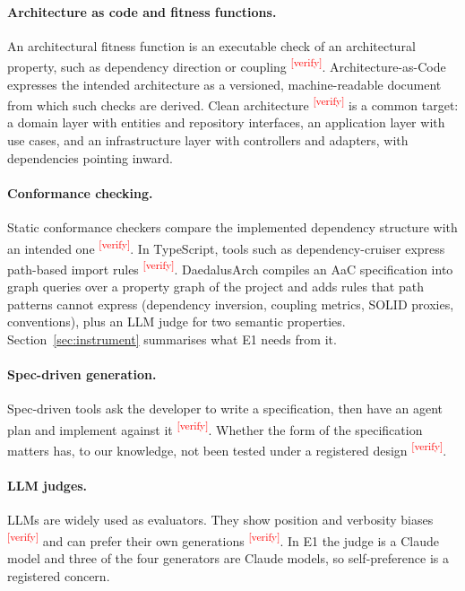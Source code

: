 \documentclass[10pt,a4paper]{article}
\newcommand{\citeneeded}[1]{\cite{#1}\textsuperscript{\textcolor{red}{\tiny[verify]}}}
\newcommand{\tool}{DaedalusArch}
\begin{document}
\paragraph{Architecture as code and fitness functions.} An architectural fitness function is an executable check of
an architectural property, such as dependency direction or coupling \citeneeded{ford2017evolutionary,ford2022evolutionary2}.
Architecture-as-Code expresses the intended architecture as a versioned, machine-readable document from which such
checks are derived. Clean architecture \citeneeded{martin2017clean} is a common target: a domain layer with
entities and repository interfaces, an application layer with use cases, and an infrastructure layer with
controllers and adapters, with dependencies pointing inward.

\paragraph{Conformance checking.} Static conformance checkers compare the implemented dependency structure with an
intended one \citeneeded{murphy1995reflexion,koschke2003hierarchical,terra2009dcl}. In TypeScript, tools such as
dependency-cruiser express path-based import rules \citeneeded{depcruise}. \tool{} \cite{daedalus2026tool} compiles an
AaC specification into graph queries over a property graph of the project and adds rules that path patterns cannot
express (dependency inversion, coupling metrics, SOLID proxies, conventions), plus an LLM judge for two semantic
properties. Section~\ref{sec:instrument} summarises what E1 needs from it.

\paragraph{Spec-driven generation.} Spec-driven tools ask the developer to write a specification, then have an
agent plan and implement against it \citeneeded{speckit2025,kiro2025}. Whether the form of the specification matters
has, to our knowledge, not been tested under a registered design \citeneeded{dhar2024adr,jahic2024practice}.

\paragraph{LLM judges.} LLMs are widely used as evaluators. They show position and verbosity biases
\citeneeded{wang2023fair,zheng2023judging} and can prefer their own generations
\citeneeded{panickssery2024self,wataoka2024selfpref}. In E1 the judge is a Claude model and three of the four
generators are Claude models, so self-preference is a registered concern.
\end{document}
